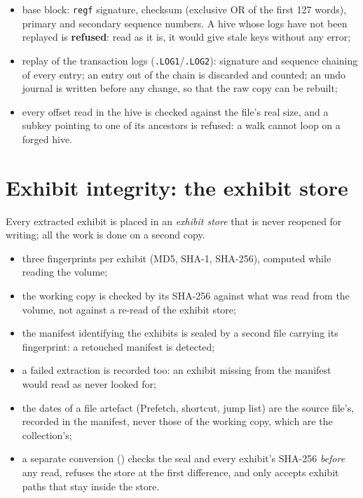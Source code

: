 \documentclass[11pt,a4paper,oneside]{report}
\begin{document}
\begin{itemize}
  \item base block: \texttt{regf} signature, checksum (exclusive OR of the
    first 127 words), primary and secondary sequence numbers. A hive whose logs
    have not been replayed is \textbf{refused}: read as it is, it would give
    stale keys without any error;
  \item replay of the transaction logs (\texttt{.LOG1}/\texttt{.LOG2}):
    signature and sequence chaining of every entry; an entry out of the chain
    is discarded and counted; an undo journal is written before any change, so
    that the raw copy can be rebuilt;
  \item every offset read in the hive is checked against the file's real
    size, and a subkey pointing to one of its ancestors is refused: a walk
    cannot loop on a forged hive.
\end{itemize}

\section{Exhibit integrity: the exhibit store}

Every extracted exhibit is placed in an \emph{exhibit store} that is never
reopened for writing; all the work is done on a second copy.

\begin{itemize}
  \item three fingerprints per exhibit (MD5, SHA-1, SHA-256), computed while
    reading the volume;
  \item the working copy is checked by its SHA-256 against what was read from
    the volume, not against a re-read of the exhibit store;
  \item the manifest identifying the exhibits is sealed by a second file
    carrying its fingerprint: a retouched manifest is detected;
  \item a failed extraction is recorded too: an exhibit missing from the
    manifest would read as never looked for;
  \item the dates of a file artefact (Prefetch, shortcut, jump list) are the
    source file's, recorded in the manifest, never those of the working copy,
    which are the collection's;
  \item a separate conversion () checks the seal and every
    exhibit's SHA-256 \emph{before} any read, refuses the store at the first
    difference, and only accepts exhibit paths that stay inside the store.
\end{itemize}
\end{document}
